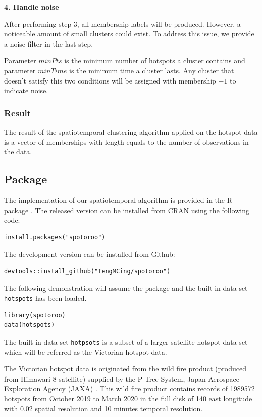 \textbf{4. Handle noise}

After performing step 3, all membership labels will be produced.
However, a noticeable amount of small clusters could exist. To address
this issue, we provide a noise filter in the last step.

Parameter \(minPts\) is the minimum number of hotspots a cluster
contains and parameter \(minTime\) is the minimum time a cluster lasts.
Any cluster that doesn't satisfy this two conditions will be assigned
with membership \(-1\) to indicate noise.

\hypertarget{result}{%
\subsubsection{Result}\label{result}}

The result of the spatiotemporal clustering algorithm applied on the
hotspot data is a vector of memberships with length equals to the number
of observations in the data.

\hypertarget{package}{%
\subsection{Package}\label{package}}

The implementation of our spatiotemporal algorithm is provided in the R
package . The released version can be installed from
CRAN using the following code:

\begin{verbatim}
install.packages("spotoroo")
\end{verbatim}

The development version can be installed from Github:

\begin{verbatim}
devtools::install_github("TengMCing/spotoroo")
\end{verbatim}

The following demonstration will assume the package 
and the built-in data set \texttt{hotspots} has been loaded.

\begin{verbatim}
library(spotoroo)
data(hotspots)
\end{verbatim}

The built-in data set \texttt{hotpsots} is a subset of a larger
satellite hotspot data set which will be referred as the Victorian
hotspot data.

The Victorian hotspot data is originated from the wild fire product
(produced from Himawari-8 satellite) supplied by the P-Tree System,
Japan Aerospace Exploration Agency (JAXA) \citeyearpar{jaxa}. This wild
fire product contains records of 1989572 hotspots from October 2019 to
March 2020 in the full disk of 140 \textdegree east longitude with 0.02
\textdegree spatial resolution and 10 minutes temporal resolution.

